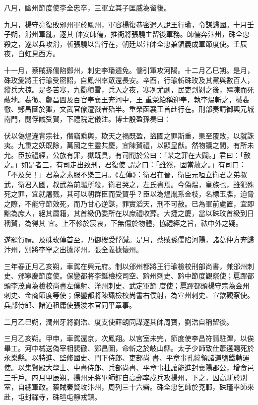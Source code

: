 \begin{pinyinscope}
 八月，幽州節度使李全忠卒，三軍立其子匡威為留後。



 九月，楊守亮復敗邠州軍於鳳州，軍容楊復恭密遣人說王行瑜，令謀歸國。十月壬子朔，滑州軍亂，逐其
 帥安師儒，推衙將張驍主留後軍務。師儒奔汴州，硃全忠殺之，遂以兵攻滑，斬張驍以告行在，朝廷以汴帥全忠兼領義成軍節度使。壬辰夜，白虹見西方。



 十一月，蔡賊孫儒陷鄭州，刺史李璠遁免。儒引軍攻河陽。十二月乙巳朔。是月，硃玫愛將王行瑜受密詔，自鳳州率眾還長安。辛酉，行瑜斬硃玫及其黨與數百人，縱兵大掠。是冬苦寒，九衢積雪，兵入之夜，寒冽尤劇，民吏剽剝之後，殭凍而死蔽地。裴徹、鄭昌圖及百官奉襄王奔河中，王
 重榮紿稱迎奉，執李煴斬之，械裴徹、鄭昌圖於獄，文武官僚遭戮者殆半。重榮函襄王首赴行在。刑部奏請御興元城南門，閱俘馘受賀，下禮院定儀注。博士殷盈孫奏曰：



 伏以偽煴違背宗社，僭竊乘輿，欺天之禍既盈，盜國之罪斯重，果至覆敗，以就誅夷。九重之妖既除，萬國之生靈共慶，宜陳賀禮，以顯皇猷。然物議之間，有所未允。臣按禮經，公族有罪，獄既具，有司聞於公曰：「某之罪在大闢。」君曰：「赦之。」如是者三，有司走出致刑，君復使
 謂之曰：「雖然，固當赦之。」有司曰：「不及矣！」君為之素服不樂三月。《左傳》：衛君在晉，衛臣元咺立衛君之弟叔武，衛君入國，叔武為前驅所殺，衛君哭之，左氏書焉。今偽煴，皇族也，雖犯殊死之罪，宜就屠戮，其可以朝群臣而受賀乎？臣以為煴胤系金枝，名標玉牒，迫脅之際，不能守節效死，而乃甘心逆謀，罪實滔天，刑不可赦。已為軍前處置，宜即黜為庶人，絕其屬籍，其首級仍委所在以庶禮收葬。大捷之慶，當以硃玫首級到日稱賀，為得其
 宜。上不軫於宸衷，下無傷於物體，協禮經之旨，祛中外之疑。



 遂罷賀禮。及硃玫傳首至，乃御樓受俘馘。是月，蔡賊孫儒陷河陽，諸葛仲方奔歸汴州，別將李罕之出據澤州，張全義據懷州。



 三年春正月乙亥朔，車駕在興元府。制以邠州都將王行瑜檢校刑部尚書，兼邠州刺史、邠寧慶節度使。保鑾都將李鋋檢校司空、黔州刺史、黔中節度觀察使；扈蹕都頭李茂貞為檢校尚書左僕射、洋州刺史、武定軍節
 度使；扈蹕都頭楊守宗為金州刺史、金商節度等使；保鑾都將陳珮檢校尚書右僕射，為宣州刺史、宣歙觀察使。兵部侍郎、諸道租庸使張浚本官同平章事。



 二月乙巳朔，潤州牙將劉浩、度支使薛朗同謀逐其帥周寶，劉浩自稱留後。



 三月乙亥朔。甲申，車駕還京，次鳳翔。以宮室未完，節度使李昌符請駐蹕，以俟畢工。河中械送偽宰相裴徹、鄭昌圖，命斬之於岐山縣。太子少師致仕蕭遘賜死於永樂縣。以特進、監修國史、門下侍郎、吏部尚
 書、平章事孔緯領諸道鹽鐵轉運使。以集賢殿大學士、中書侍郎、兵部尚書、平章事杜讓能進封襄陽郡公，增食邑三千戶。四月甲辰朔，揚州牙將畢師鐸自高郵率戍兵攻揚州，下之，囚高駢於別室，自總軍政。蔡賊秦賢攻汴州，周列三十六砦。硃全忠乞師於兗鄆，硃瑾率師來赴，屯封禪寺，硃瑄屯靜戎鎮。




\end{pinyinscope}
